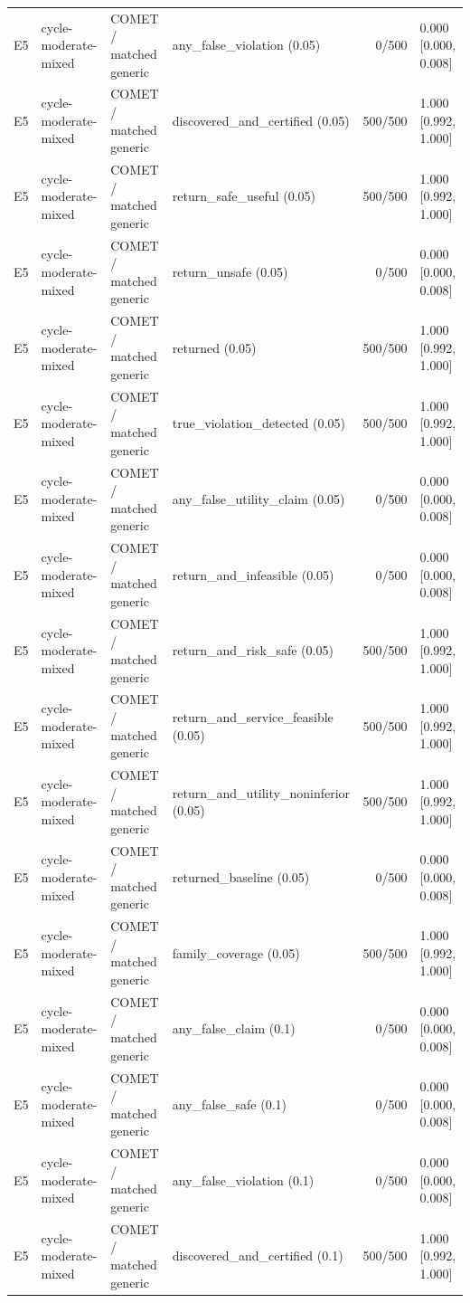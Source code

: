 \begin{longtable}{p{.04\linewidth}p{.18\linewidth}p{.19\linewidth}p{.16\linewidth}r p{.21\linewidth}}
E5 & cycle-moderate-mixed & COMET / matched generic & any\_false\_violation (0.05) & 0/500 & 0.000 [0.000, 0.008]\\
E5 & cycle-moderate-mixed & COMET / matched generic & discovered\_and\_certified (0.05) & 500/500 & 1.000 [0.992, 1.000]\\
E5 & cycle-moderate-mixed & COMET / matched generic & return\_safe\_useful (0.05) & 500/500 & 1.000 [0.992, 1.000]\\
E5 & cycle-moderate-mixed & COMET / matched generic & return\_unsafe (0.05) & 0/500 & 0.000 [0.000, 0.008]\\
E5 & cycle-moderate-mixed & COMET / matched generic & returned (0.05) & 500/500 & 1.000 [0.992, 1.000]\\
E5 & cycle-moderate-mixed & COMET / matched generic & true\_violation\_detected (0.05) & 500/500 & 1.000 [0.992, 1.000]\\
E5 & cycle-moderate-mixed & COMET / matched generic & any\_false\_utility\_claim (0.05) & 0/500 & 0.000 [0.000, 0.008]\\
E5 & cycle-moderate-mixed & COMET / matched generic & return\_and\_infeasible (0.05) & 0/500 & 0.000 [0.000, 0.008]\\
E5 & cycle-moderate-mixed & COMET / matched generic & return\_and\_risk\_safe (0.05) & 500/500 & 1.000 [0.992, 1.000]\\
E5 & cycle-moderate-mixed & COMET / matched generic & return\_and\_service\_feasible (0.05) & 500/500 & 1.000 [0.992, 1.000]\\
E5 & cycle-moderate-mixed & COMET / matched generic & return\_and\_utility\_noninferior (0.05) & 500/500 & 1.000 [0.992, 1.000]\\
E5 & cycle-moderate-mixed & COMET / matched generic & returned\_baseline (0.05) & 0/500 & 0.000 [0.000, 0.008]\\
E5 & cycle-moderate-mixed & COMET / matched generic & family\_coverage (0.05) & 500/500 & 1.000 [0.992, 1.000]\\
E5 & cycle-moderate-mixed & COMET / matched generic & any\_false\_claim (0.1) & 0/500 & 0.000 [0.000, 0.008]\\
E5 & cycle-moderate-mixed & COMET / matched generic & any\_false\_safe (0.1) & 0/500 & 0.000 [0.000, 0.008]\\
E5 & cycle-moderate-mixed & COMET / matched generic & any\_false\_violation (0.1) & 0/500 & 0.000 [0.000, 0.008]\\
E5 & cycle-moderate-mixed & COMET / matched generic & discovered\_and\_certified (0.1) & 500/500 & 1.000 [0.992, 1.000]\\

\end{longtable}
